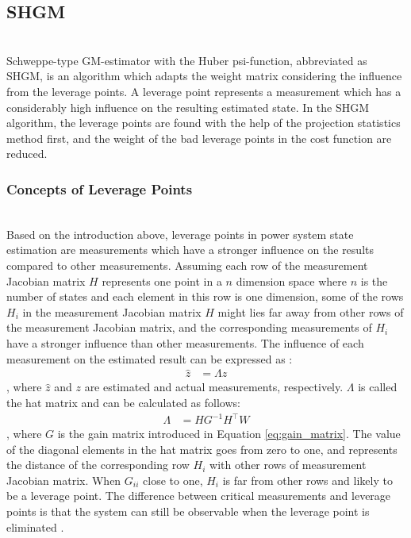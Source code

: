\subsection{SHGM}
\\Schweppe-type GM-estimator with the Huber psi-function, abbreviated as SHGM, is an algorithm which adapts the weight matrix considering the influence from the leverage points. A leverage point represents a measurement which has a considerably high influence on the resulting estimated state. In the SHGM algorithm, the leverage points are found with the help of the projection statistics method first, and the weight of the bad leverage points in the cost function are reduced.

\subsubsection{Concepts of Leverage Points}
\\Based on the introduction above, leverage points in power system state estimation are measurements which have a stronger influence on the results compared to other measurements. Assuming each row of the measurement Jacobian matrix $H$ represents one point in a $n$ dimension space where $n$ is the number of states and each element in this row is one dimension, some of the rows $H_i$ in the measurement Jacobian matrix $H$ might lies far away from other rows of the measurement Jacobian matrix, and the corresponding measurements of $H_i$ have a stronger influence than other measurements. The influence of each measurement on the estimated result can be expressed as \cite{gomez2004power}:
\begin{align}
    \hat{z} &= \Lambda z
    \label{eq:hat_matrix_equation}
\end{align}
, where $\hat{z}$ and $z$ are estimated and actual measurements, respectively. $\Lambda$ is called the hat matrix and can be calculated as follows:
\begin{align}
    \Lambda &= H G^{-1} H^{\intercal} W 
    \label{eq:hat_matrix_defination}
\end{align}
, where $G$ is the gain matrix introduced in Equation \ref{eq:gain_matrix}. The value of the diagonal elements in the hat matrix goes from zero to one, and represents the distance of the corresponding row $H_i$ with other rows of measurement Jacobian matrix. When $G_{ii}$ close to one, $H_i$ is far from other rows and likely to be a leverage point. The difference between critical measurements and leverage points is that the system can still be observable when the leverage point is eliminated \cite{gomez2004power}. 
